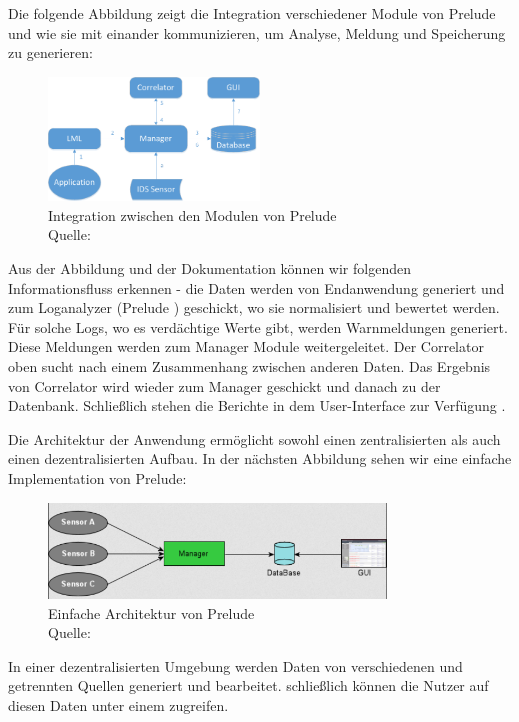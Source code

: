 Die folgende Abbildung zeigt die Integration verschiedener Module von Prelude und wie sie mit einander kommunizieren, um Analyse, Meldung und Speicherung zu generieren:

\begin{figure}[H]
   \centering
   \includegraphics[width=0.5\textwidth]{assets/2_p3.png}
   \caption{Integration zwischen den Modulen von Prelude \\Quelle: \citep{Prelude_MU} }
   \centering
\end{figure}

Aus der Abbildung und der Dokumentation können wir folgenden Informationsfluss erkennen - die Daten werden von Endanwendung generiert und zum Loganalyzer (Prelude ) geschickt, wo sie normalisiert und bewertet werden. Für solche Logs, wo es verdächtige Werte gibt, werden Warnmeldungen generiert. Diese Meldungen werden zum Manager Module weitergeleitet. Der Correlator oben sucht nach einem Zusammenhang zwischen anderen Daten. Das Ergebnis von Correlator wird wieder zum Manager geschickt und danach zu der Datenbank. Schließlich stehen die Berichte in dem User-Interface zur Verfügung \citep{Prelude_Doc}.

Die Architektur der Anwendung ermöglicht sowohl einen zentralisierten als auch einen dezentralisierten Aufbau. In der nächsten Abbildung sehen wir eine einfache Implementation von Prelude:

\begin{figure}[H]
   \centering
   \includegraphics[width=0.8\textwidth]{assets/2_p4.png}
   \caption{Einfache Architektur von Prelude \\Quelle: \citep{Prelude_MU} }
   \centering
\end{figure}

In einer dezentralisierten Umgebung werden Daten von verschiedenen und getrennten Quellen generiert und bearbeitet. schließlich können die Nutzer auf diesen Daten unter einem  zugreifen.

